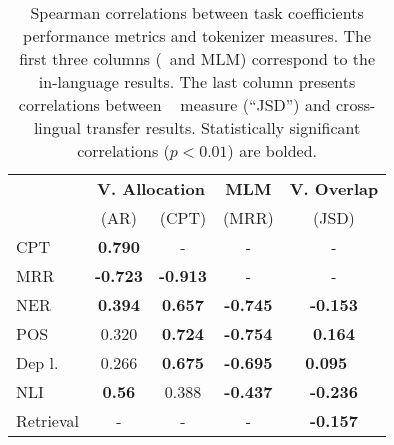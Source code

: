 \begin{table}
\footnotesize
\centering

\begin{tabular}{lccc|c}
\toprule
 & \multicolumn{2}{c}{\bf{V. Allocation}} & \bf{MLM} & \bf{V. Overlap} \\
 & (AR) &  (CPT)  &  (MRR) & (JSD) \\
\midrule
CPT    &    \bf{0.790} &     - &  - & - \\
MRR    &  \bf{-0.723} &  \bf{-0.913} &  - & - \\
NER    &   \bf{0.394} &   \bf{0.657} &  \bf{-0.745} & \bf{-0.153}\\
POS    &     0.320 &   \bf{0.724} &  \bf{-0.754} & \bf{0.164}  \\
Dep l. &     0.266 &   \bf{0.675} &  \bf{-0.695} & \bf{0.095} \ \\
NLI   &    \bf{0.56} &    0.388 &  \bf{-0.437} & \bf{-0.236} \\
Retrieval & - & - & - & \bf{-0.157} \\ 
\bottomrule
\end{tabular}
\caption{Spearman correlations between task coefficients performance metrics and tokenizer measures. The first three columns (\va~and MLM) correspond to the in-language results. The last column presents correlations between \vo~ measure (``JSD'') and cross-lingual transfer results. Statistically significant correlations ($p<0.01$) are bolded. }
\label{tab:corr_in_lang_20l}
\end{table}
